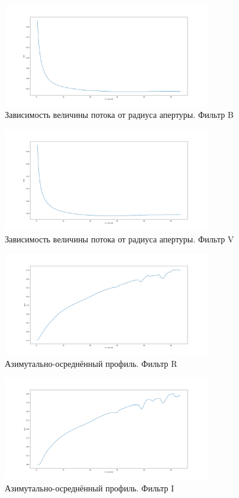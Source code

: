 \documentclass [12pt, a4paper] {article}
\theoremstyle{definition}
\begin{document}
		\begin{figure}
		\centering
			\includegraphics[width = 0.8\textwidth]{B_slice_I(R).png}
						\caption{Зависимость величины потока от радиуса апертуры. Фильтр B}
					\end{figure}
		\begin{figure}
		\centering
			\includegraphics[width = 0.8\textwidth]{V_slice_I(R).png}
			\caption{Зависимость величины потока от радиуса апертуры. Фильтр V}
\end{figure}
\begin{figure}
		\centering
			\includegraphics[width = 0.8\textwidth]{R_slice_dI(R).png}
			\caption{Азимутально-осреднённый профиль. Фильтр R}
		\end{figure}
		\begin{figure}
		\centering
			\includegraphics[width = 0.8\textwidth]{I_slice_dI(R).png}
						\caption{Азимутально-осреднённый профиль. Фильтр I}
		\end{figure}
\end{document}
